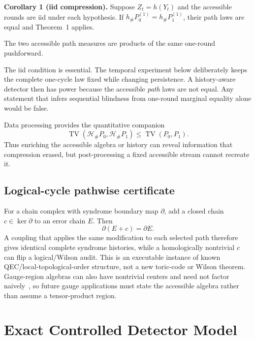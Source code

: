\documentclass[letterpaper,journal]{IEEEtran}
\newcommand{\TV}{\operatorname{TV}}
\newcommand{\cH}{\mathcal H}
\begin{document}
\textbf{Corollary 1 (iid compression).}
Suppose $Z_t=h(Y_t)$ and the accessible rounds are iid under each hypothesis.
If $h_\#P_0^{(1)}=h_\#P_1^{(1)}$, their path laws are equal and
Theorem~1 applies.

\begin{IEEEproof}
The two accessible path measures are products of the same one-round
pushforward.
\end{IEEEproof}

The iid condition is essential. The temporal experiment below deliberately
keeps the complete one-cycle law fixed while changing persistence. A
history-aware detector then has power because the accessible \emph{path}
laws are not equal. Any statement that infers sequential blindness from
one-round marginal equality alone would be false.

Data processing provides the quantitative companion
\begin{equation}
\TV(\cH_\#P_0,\cH_\#P_1)\leq \TV(P_0,P_1).
\label{eq:data-processing}
\end{equation}
Thus enriching the accessible algebra or history can reveal information that
compression erased, but post-processing a fixed accessible stream cannot
recreate it.

\subsection{Logical-cycle pathwise certificate}

For a chain complex with syndrome boundary map $\partial$, add a closed chain
$c\in\ker\partial$ to an error chain $E$. Then
\begin{equation}
\partial(E+c)=\partial E.
\label{eq:logical-nogo}
\end{equation}
A coupling that applies the same modification to each selected path therefore
gives identical complete syndrome histories, while a homologically
nontrivial $c$ can flip a logical/Wilson audit. This is an executable instance
of known QEC/local-topological-order structure, not a new toric-code or Wilson
theorem. Gauge-region algebras can also have nontrivial centers and need not
factor naively~\cite{casini2014}, so future gauge applications must state the
accessible algebra rather than assume a tensor-product region.

\section{Exact Controlled Detector Model}
\end{document}
